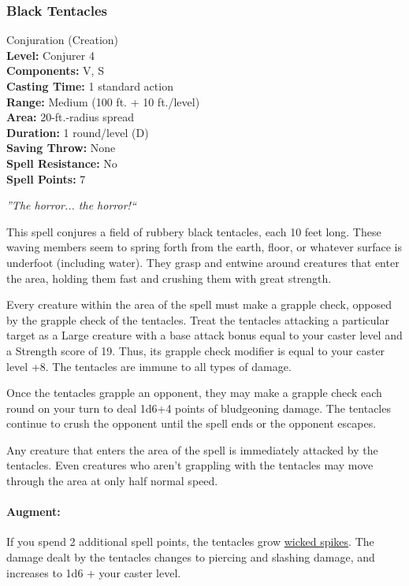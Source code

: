 \subsubsection{Black Tentacles}
\label{Spell:BlackTentacles}
Conjuration (Creation)
\\ \textbf{Level:} Conjurer 4
\\ \textbf{Components:} V, S
\\ \textbf{Casting Time:} 1 standard action
\\ \textbf{Range:} Medium (100 ft. + 10 ft./level)
\\ \textbf{Area:} 20-ft.-radius spread
\\ \textbf{Duration:} 1 round/level (D)
\\ \textbf{Saving Throw:} None
\\ \textbf{Spell Resistance:} No
\\ \textbf{Spell Points:} 7

\emph{''The horror... the horror!``}

This spell conjures a field of rubbery black tentacles, each 10 feet long. 
These waving members seem to spring forth from the earth, floor, or whatever surface is underfoot (including water). 
They grasp and entwine around creatures that enter the area, holding them fast and crushing them with great strength.

Every creature within the area of the spell must make a grapple check, opposed by the grapple check of the tentacles. 
Treat the tentacles attacking a particular target as a Large creature with a base attack bonus equal to your caster level and a Strength score of 19. 
Thus, its grapple check modifier is equal to your caster level +8. 
The tentacles are immune to all types of damage.

Once the tentacles grapple an opponent, they may make a grapple check each round on your turn to deal 1d6+4 points of bludgeoning damage. 
The tentacles continue to crush the opponent until the spell ends or the opponent escapes.

Any creature that enters the area of the spell is immediately attacked by the tentacles. 
Even creatures who aren't grappling with the tentacles may move through the area at only half normal speed.

\paragraph{Augment:} 
If you spend 2 additional spell points, the tentacles grow
\href{http://www.giantitp.com/comics/oots0020.html}{wicked spikes}. 
The damage dealt by the tentacles changes to piercing and slashing damage, and increases to 1d6 + your caster level.
